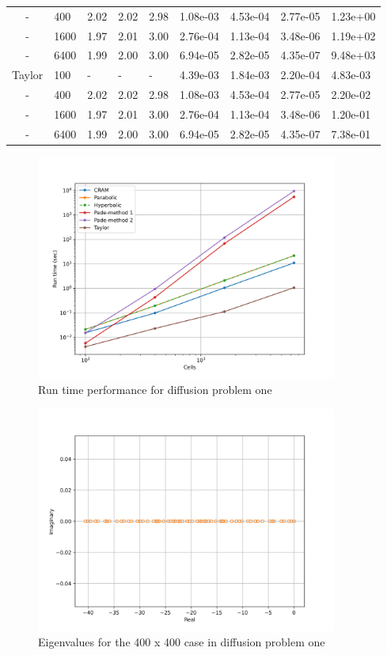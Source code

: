\begin{table}[p]
{\begin{tabular}{cllllllll}
   - &  400 & 2.02 & 2.02 & 2.98 & 1.08e-03 & 4.53e-04 & 2.77e-05 & 1.23e+00 \\ 
   - & 1600 & 1.97 & 2.01 & 3.00 & 2.76e-04 & 1.13e-04 & 3.48e-06 & 1.19e+02 \\ 
   - & 6400 & 1.99 & 2.00 & 3.00 & 6.94e-05 & 2.82e-05 & 4.35e-07 & 9.48e+03 \\ 
   \hline
   Taylor       &  100 & - & - & - & 4.39e-03 & 1.84e-03 & 2.20e-04 & 4.83e-03 \\ 
   -      &  400 & 2.02 & 2.02 & 2.98 & 1.08e-03 & 4.53e-04 & 2.77e-05 & 2.20e-02 \\ 
   -      & 1600 & 1.97 & 2.01 & 3.00 & 2.76e-04 & 1.13e-04 & 3.48e-06 & 1.20e-01 \\ 
   -      & 6400 & 1.99 & 2.00 & 3.00 & 6.94e-05 & 2.82e-05 & 4.35e-07 & 7.38e-01 \\ 
   \hline
   \end{tabular}
   }
\end{table}

\clearpage

\begin{figure}[ht]
    \centering
    \includegraphics[width=3.9in]{images/chapter-5/progressionProblems/problem1/diffusionProblem1Runtime.png}
    \caption{Run time performance for diffusion problem one}
    \label{fig:runtime_diffusion_one}
\end{figure}

\begin{figure}[hb]
    \centering
    \includegraphics[width=3.9in]{images/chapter-5/progressionProblems/problem1/eigenvaluesDiffusion1-20.png}
    \caption{Eigenvalues for the 400 x 400 case in diffusion problem one}
    \label{fig:eigenvalues_diffusion_one}
\end{figure}

